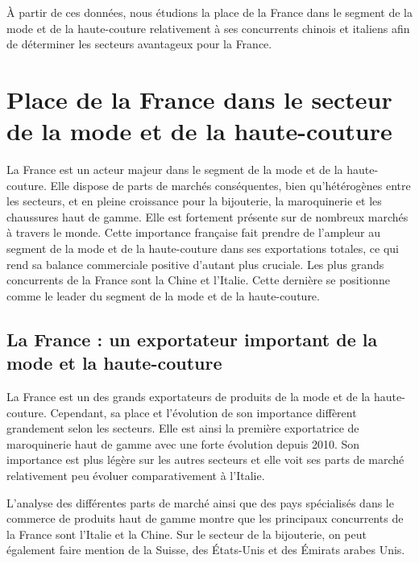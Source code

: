\documentclass[french,10pt,a4paper]{article}
\begin{document}
\bigskip

À partir de ces données, nous étudions la place de la France dans le segment de la mode et de la haute-couture relativement à ses concurrents chinois et italiens afin de déterminer les secteurs avantageux pour la France.

\section{Place de la France dans le secteur de la mode et de la haute-couture}
La France est un acteur majeur dans le segment de la mode et de la haute-couture. Elle dispose de parts de marchés conséquentes, bien qu'hétérogènes entre les secteurs, et en pleine croissance pour la bijouterie, la maroquinerie et les chaussures haut de gamme. Elle est fortement présente sur de nombreux marchés à travers le monde. Cette importance française fait prendre de l'ampleur au segment de la mode et de la haute-couture dans ses exportations totales, ce qui rend sa balance commerciale positive d'autant plus cruciale. Les plus grands concurrents de la France sont la Chine et l'Italie. Cette dernière se positionne comme le leader du segment de la mode et de la haute-couture. 


\subsection{La France : un exportateur important de la mode et la haute-couture}
La France est un des grands exportateurs de produits de la mode et de la haute-couture. Cependant, sa place et l'évolution de son importance diffèrent grandement selon les secteurs. Elle est ainsi la première exportatrice de maroquinerie haut de gamme avec une forte évolution depuis 2010. Son importance est plus légère sur les autres secteurs et elle voit ses parts de marché relativement peu évoluer comparativement à l'Italie. 

L'analyse des différentes parts de marché ainsi que des pays spécialisés dans le commerce de produits haut de gamme montre que les principaux concurrents de la France sont l'Italie et la Chine. Sur le secteur de la bijouterie, on peut également faire mention de la Suisse, des États-Unis et des Émirats arabes Unis.

\bigskip
\end{document}
